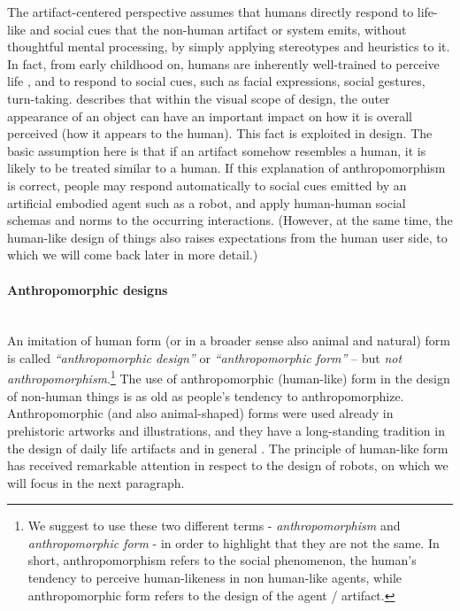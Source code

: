 \documentclass{frontiersSCNS} %
\begin{document}
The artifact-centered perspective assumes that humans directly respond to life-like and social cues that the non-human artifact or system emits, without thoughtful mental processing, by simply applying stereotypes and heuristics to it. In fact, from early childhood on, humans are inherently well-trained to perceive life \citep{epley_seeing_2007}, and to respond to social cues, such as facial expressions, social gestures, turn-taking. \cite{schmitz_concepts_2011} describes that within the visual scope of design, the outer appearance of an object can have an important impact on how it is overall perceived (how it appears to the human). This fact is exploited in design. The basic assumption  here is that if an artifact somehow resembles a human, it is likely to be treated similar to a human. If this explanation of anthropomorphism is correct, people may respond automatically to social cues emitted by an artificial embodied agent such as a robot, and apply human-human social schemas and norms to the occurring interactions. (However, at the same time, the human-like design of things also raises expectations from the human user side, to which we will come back later in more detail.)


\paragraph*{Anthropomorphic designs\\ \\}

An imitation of human form (or in a broader sense also animal and natural) form is called \textit{``anthropomorphic design''} or \textit{``anthropomorphic form''} -- but \textit{not anthropomorphism}.\footnote{We suggest to use these two different terms - \textit{anthropomorphism} and \textit{anthropomorphic form} - in order to highlight that they are not the same. In short, anthropomorphism refers to the social phenomenon, the human's tendency to perceive human-likeness in non human-like agents, while anthropomorphic form refers to the design of the agent / artifact.} The use of anthropomorphic (human-like) form in the design of non-human things is as old as people's tendency to anthropomorphize. Anthropomorphic (and also animal-shaped) forms were used already in prehistoric artworks and illustrations, and they have a long-standing tradition in the design of daily life artifacts and in general \citep{guthrie_bottles_2000}. The principle of human-like form has received remarkable attention in respect to the design of robots, on which we will focus in the next paragraph.
\end{document}
